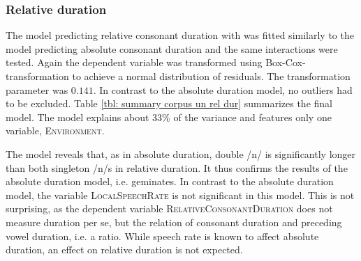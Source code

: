 \subsubsection{Relative duration}


The model predicting relative consonant duration with  was fitted similarly to the model predicting absolute consonant duration and the same interactions were tested. Again the dependent variable was transformed using Box-Cox- transformation to achieve a normal distribution of residuals. The transformation parameter was $0.141$. In contrast to the absolute duration model, no outliers had to be excluded. 
 Table \ref{tbl: summary corpus un rel dur} summarizes the final model. The model explains about 33\% of the variance and features only one variable, \textsc{Environment}.



\begin{table}
	\caption{ Summary of linear model for variables predicting the Box-Cox-transformed relative duration of [n] in prefixed words}
	\label{tbl: summary corpus un rel dur}
	
		
	
\end{table}



The model reveals that, as in absolute duration, double /n/ is significantly longer than both singleton /n/s in relative duration. It thus confirms the results of the absolute duration model, i.e.  geminates. In contrast to the absolute duration model, the variable \textsc{LocalSpeechRate} is not significant in this model. This is not surprising, as the dependent variable \textsc{RelativeConsonantDuration} does not measure duration per se, but the relation of consonant duration and preceding vowel duration, i.e. a ratio. While speech rate is known to affect absolute duration, an effect on relative duration is not expected. 

